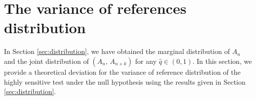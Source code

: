 \documentclass[dvipdfmx,english]{ampmt} %
\begin{document}
\newpage
\section{The variance of references distribution}\label{sec:3}
In Section \ref{sec:distribution}, we have obtained the marginal distribution of $A_n$ and the joint distribution of $(A_n,\,A_{n+k})$ for any $\hat{q}\in (0,1)$.
%
In this section, we provide a theoretical deviation for the variance of reference distribution of the highly sensitive test under the null hypothesis using the results given in Section \ref{sec:distribution}.
\end{document}
